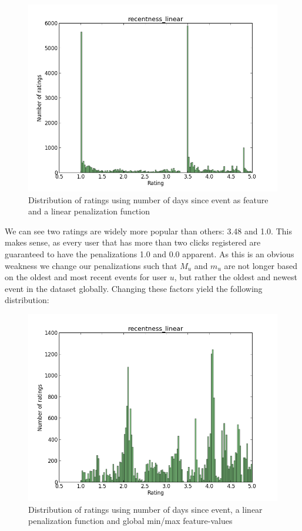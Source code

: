 \begin{figure}[H]
  \centering
  \includegraphics[scale=0.6]{image/dist-recentness-linear}
  \caption{Distribution of ratings using number of days since event as feature
  and a linear penalization function}
\end{figure}

We can see two ratings are widely more popular than others: 3.48 and 1.0. This
makes sense, as every user that has more than two clicks registered are
guaranteed to have the penalizations 1.0 and 0.0 apparent. As this is an
obvious weakness we change our penalizations such that $M_u$ and $m_u$ are not
longer based on the oldest and most recent events for user $u$, but rather the
oldest and newest event in the dataset globally. Changing these factors yield
the following distribution:

\begin{figure}[H]
  \centering
  \includegraphics[scale=0.6]{image/dist-recentness-linear-global}
 \caption{Distribution of ratings using number of days since event, a linear
 penalization function and global min/max feature-values}
  \label{fig:dist-recentness-linear-global}
\end{figure}

